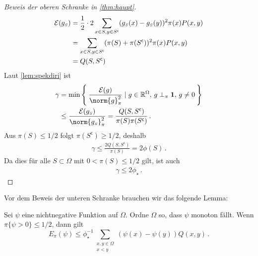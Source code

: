 \documentclass[ngerman,a4paper,11pt]{scrartcl}
\newcommand{\stcomp}[1]{{#1}^{\mathsf{c}}} %
\newcommand{\diri}{\mathcal{E}}
\newcommand{\RR}{\mathbb{R}}
\newcommand{\smallS}{{\mathchoice{}{}{\scriptscriptstyle}{}S}}
\begin{document}
\begin{proof}[Beweis der oberen Schranke in \cref{thm:haupt}]
\begin{align*}
  \diri(g_\smallS)&=\frac{1}{2}\cdot 2\sum_{x\in S,y\in\stcomp{S}}(g_\smallS(x)-g_\smallS(y))^2\pi(x)P(x,y) \\
  &=\sum_{x\in S,y\in\stcomp{S}}(\pi(S)+\pi(\stcomp{S}))^2\pi(x)P(x,y) \\
  &=Q(S,\stcomp{S})
 \end{align*}
 Laut \cref{lem:spekdiri} ist
 \begin{align*}
  \gamma&=\min\Set{\frac{\diri(g)}{\norm{g}_\pi^2}\mid g\in\RR^\Omega,\, g\perp_\pi\mathbf{1},\, g\neq 0} \\
  &\leq\frac{\diri(g_\smallS)}{\norm{g_\smallS}_\pi^2}=\frac{Q(S,\stcomp{S})}{\pi(S)\pi(\stcomp{S})} \, .
 \end{align*}
 Aus $\pi(S)\leq 1/2$ folgt $\pi(\stcomp{S})\geq 1/2$, deshalb
 \begin{align*}
  \gamma\leq\frac{2Q(S,\stcomp{S})}{\pi(S)}=2\phi(S) \, .
 \end{align*}
 Da dies für alle $S\subset\Omega$ mit $0<\pi(S)\leq 1/2$ gilt, ist auch
 \begin{align*}
  \gamma\leq 2\phi_\star\, . 
 \end{align*}
\end{proof}
Vor dem Beweis der unteren Schranke brauchen wir das folgende Lemma:
\begin{lem}
 \label{lem:ordn}
 Sei $\psi$ eine nichtnegative Funktion auf $\Omega$. Ordne $\Omega$ so, dass
 $\psi$ monoton fällt. Wenn $\pi\{\psi>0\}\leq 1/2$, dann gilt
 \begin{equation*}
  E_\pi(\psi)\leq\phi_\star^{-1}\sum_{\substack{x,y\in\Omega\\x<y}}(\psi(x)-\psi(y))Q(x,y)\, .
 \end{equation*}
\end{lem}
\end{document}
